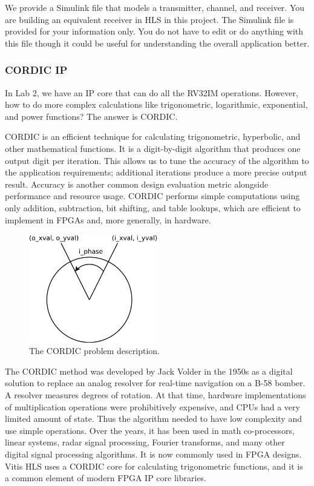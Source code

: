 \documentclass[a4paper,12pt,twoside]{article}
\begin{document}
We provide a Simulink file that models a transmitter, channel, and receiver. You are building an equivalent receiver in HLS in this project. The Simulink file is provided for your information only. You do not have to edit or do anything with this file though it could be useful for understanding the overall application better.
\subsubsection{CORDIC IP}
In Lab 2, we have an IP core that can do all the RV32IM operations. However, how to do more complex calculations like trigonometric, logarithmic, exponential, and power functions? The answer is CORDIC.

CORDIC is an efficient technique for calculating trigonometric, hyperbolic, and other mathematical functions. It is a digit-by-digit algorithm that produces one output digit per iteration. This allows us to tune the accuracy of the algorithm to the application requirements; additional iterations produce a more precise output result. Accuracy is another common design evaluation metric alongside performance and resource usage. CORDIC performs simple computations using only addition, subtraction, bit shifting, and table lookups, which are efficient to implement in FPGAs and, more generally, in hardware.
\begin{figure}[H]
    \centering
    \includegraphics[width=0.5\textwidth]{images/3.pdf}
    \caption{The CORDIC problem description.}
\end{figure}
The CORDIC method was developed by Jack Volder in the 1950s as a digital solution to replace an analog resolver for real-time navigation on a B-58 bomber. A resolver measures degrees of rotation. At that time, hardware implementations of multiplication operations were prohibitively expensive, and CPUs had a very limited amount of state. Thus the algorithm needed to have low complexity and use simple operations. Over the years, it has been used in math
co-processors, linear systems, radar signal processing, Fourier transforms, and many other digital signal processing algorithms. It is now commonly used in FPGA designs. Vitis HLS uses a CORDIC core for calculating trigonometric functions, and it is a common element of modern FPGA IP core libraries.
\end{document}
